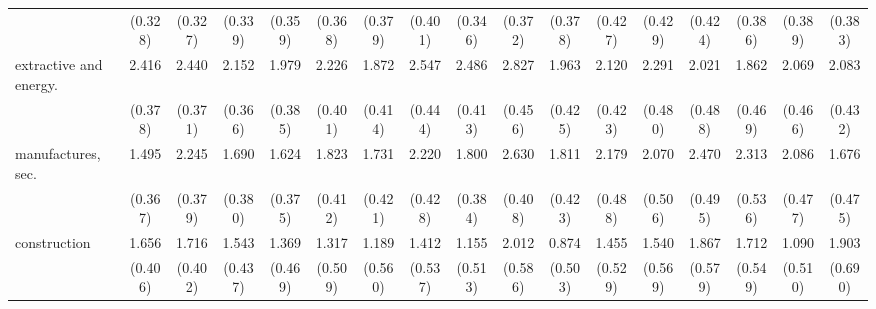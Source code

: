 {\begin{tabular}{l*{16}{c}}
                    &     (0.328)         &     (0.327)         &     (0.339)         &     (0.359)         &     (0.368)         &     (0.379)         &     (0.401)         &     (0.346)         &     (0.372)         &     (0.378)         &     (0.427)         &     (0.429)         &     (0.424)         &     (0.386)         &     (0.389)         &     (0.383)         \\
[1em]
extractive and energy.&       2.416\sym{***}&       2.440\sym{***}&       2.152\sym{***}&       1.979\sym{***}&       2.226\sym{***}&       1.872\sym{***}&       2.547\sym{***}&       2.486\sym{***}&       2.827\sym{***}&       1.963\sym{***}&       2.120\sym{***}&       2.291\sym{***}&       2.021\sym{***}&       1.862\sym{***}&       2.069\sym{***}&       2.083\sym{***}\\
                    &     (0.378)         &     (0.371)         &     (0.366)         &     (0.385)         &     (0.401)         &     (0.414)         &     (0.444)         &     (0.413)         &     (0.456)         &     (0.425)         &     (0.423)         &     (0.480)         &     (0.488)         &     (0.469)         &     (0.466)         &     (0.432)         \\
[1em]
manufactures, sec.  &       1.495\sym{***}&       2.245\sym{***}&       1.690\sym{***}&       1.624\sym{***}&       1.823\sym{***}&       1.731\sym{***}&       2.220\sym{***}&       1.800\sym{***}&       2.630\sym{***}&       1.811\sym{***}&       2.179\sym{***}&       2.070\sym{***}&       2.470\sym{***}&       2.313\sym{***}&       2.086\sym{***}&       1.676\sym{***}\\
                    &     (0.367)         &     (0.379)         &     (0.380)         &     (0.375)         &     (0.412)         &     (0.421)         &     (0.428)         &     (0.384)         &     (0.408)         &     (0.423)         &     (0.488)         &     (0.506)         &     (0.495)         &     (0.536)         &     (0.477)         &     (0.475)         \\
[1em]
construction        &       1.656\sym{***}&       1.716\sym{***}&       1.543\sym{***}&       1.369\sym{**} &       1.317\sym{**} &       1.189\sym{*}  &       1.412\sym{**} &       1.155\sym{*}  &       2.012\sym{***}&       0.874         &       1.455\sym{**} &       1.540\sym{**} &       1.867\sym{**} &       1.712\sym{**} &       1.090\sym{*}  &       1.903\sym{**} \\
                    &     (0.406)         &     (0.402)         &     (0.437)         &     (0.469)         &     (0.509)         &     (0.560)         &     (0.537)         &     (0.513)         &     (0.586)         &     (0.503)         &     (0.529)         &     (0.569)         &     (0.579)         &     (0.549)         &     (0.510)         &     (0.690)         \\

\end{tabular}}
